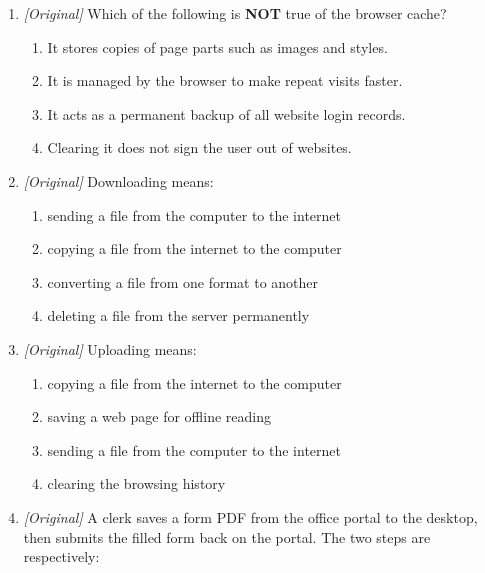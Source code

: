 \begin{enumerate}[label=\textbf{Q\arabic*.}, leftmargin=*]
\begin{enumerate}[label=\Alph*.]
    \item Cookie --- visitor data such as login and cart; Cache --- copies of page files; History --- list of visited addresses
    \item Cookie --- list of visited addresses; Cache --- visitor login data; History --- copies of page images
    \item Cookie --- saved page shortcuts; Cache --- login passwords; History --- advertised results
  \end{enumerate}
\item \textit{[Original]} Which of the following is \textbf{NOT} true of the
  browser cache?
  \begin{enumerate}[label=\Alph*.]
    \item It stores copies of page parts such as images and styles.
    \item It is managed by the browser to make repeat visits faster.
    \item It acts as a permanent backup of all website login records.
    \item Clearing it does not sign the user out of websites.
  \end{enumerate}
\item \textit{[Original]} Downloading means:
  \begin{enumerate}[label=\Alph*.]
    \item sending a file from the computer to the internet
    \item copying a file from the internet to the computer
    \item converting a file from one format to another
    \item deleting a file from the server permanently
  \end{enumerate}
\item \textit{[Original]} Uploading means:
  \begin{enumerate}[label=\Alph*.]
    \item copying a file from the internet to the computer
    \item saving a web page for offline reading
    \item sending a file from the computer to the internet
    \item clearing the browsing history
  \end{enumerate}
\item \textit{[Original]} A clerk saves a form PDF from the office portal to
  the desktop, then submits the filled form back on the portal. The two steps
  are respectively:

\end{enumerate}
